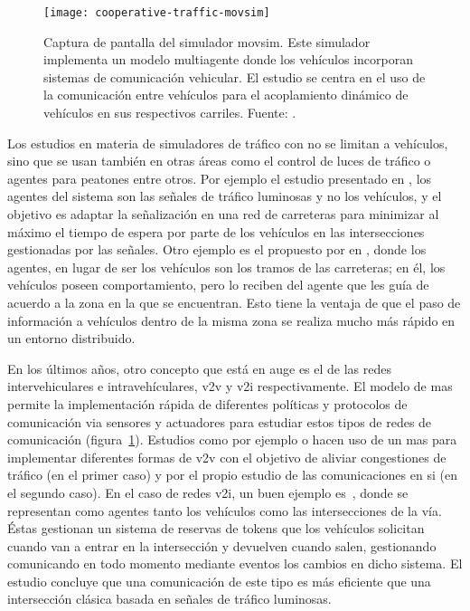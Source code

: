 \begin{figure}
	\centering
	\texttt{[image: cooperative-traffic-movsim]}
	\caption[Captura de pantalla del simulador \gls{movsim}]{Captura de pantalla del simulador \gls{movsim}. Este simulador implementa un modelo multiagente donde los vehículos incorporan sistemas de comunicación vehicular. El estudio se centra en el uso de la comunicación entre vehículos para el acoplamiento dinámico de vehículos en sus respectivos carriles. Fuente: \cite{Gu2015}.}
	\label{fig:cooperative-traffic-movsim}
\end{figure}

Los estudios en materia de simuladores de tráfico con  no se limitan a vehículos, sino que se usan también en otras áreas como el control de luces de tráfico o agentes para peatones entre otros. Por ejemplo el estudio presentado en \cite{Clymer2002}, los agentes del sistema son las señales de tráfico luminosas y no los vehículos, y el objetivo es adaptar la señalización en una red de carreteras para minimizar al máximo el tiempo de espera por parte de los vehículos en las intersecciones gestionadas por las señales. Otro ejemplo es el propuesto por en \cite{Galis2000}, donde los agentes, en lugar de ser los vehículos son los tramos de las carreteras; en él, los vehículos poseen comportamiento, pero lo reciben del agente que les guía de acuerdo a la zona en la que se encuentran. Esto tiene la ventaja de que el paso de información a vehículos dentro de la misma zona se realiza mucho más rápido en un entorno distribuido.

En los últimos años, otro concepto que está en auge es el de las redes intervehiculares e intravehículares, \gls{v2v} y \gls{v2i} respectivamente. El modelo de \gls{mas} permite la implementación rápida de diferentes políticas y protocolos de comunicación via sensores y actuadores para estudiar estos tipos de redes de comunicación (figura~\ref{fig:cooperative-traffic-movsim}). Estudios como por ejemplo \cite{Shiose2001} o \cite{Galis2000} hacen uso de un \ac{mas} para implementar diferentes formas de \ac{v2v} con el objetivo de aliviar congestiones de tráfico (en el primer caso) y por el propio estudio de las comunicaciones en si (en el segundo caso). En el caso de redes \ac{v2i}, un buen ejemplo es~\cite{Dresner2004}, donde se representan como agentes tanto los vehículos como las intersecciones de la vía. Éstas gestionan un sistema de reservas de tokens que los vehículos solicitan cuando van a entrar en la intersección y devuelven cuando salen, gestionando  comunicando en todo momento mediante eventos los cambios en dicho sistema. El estudio concluye que una comunicación de este tipo es más eficiente que una intersección clásica basada en señales de tráfico luminosas.

